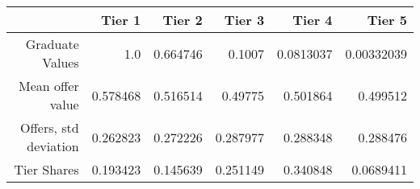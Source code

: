 \begin{tabular}{rrrrrr}
  \hline
   & \textbf{Tier 1} & \textbf{Tier 2} & \textbf{Tier 3} & \textbf{Tier 4} & \textbf{Tier 5} \\\hline
  Graduate Values & 1.0 & 0.664746 & 0.1007 & 0.0813037 & 0.00332039 \\
  Mean offer value & 0.578468 & 0.516514 & 0.49775 & 0.501864 & 0.499512 \\
  Offers, std deviation & 0.262823 & 0.272226 & 0.287977 & 0.288348 & 0.288476 \\
  Tier Shares & 0.193423 & 0.145639 & 0.251149 & 0.340848 & 0.0689411 \\\hline
\end{tabular}
